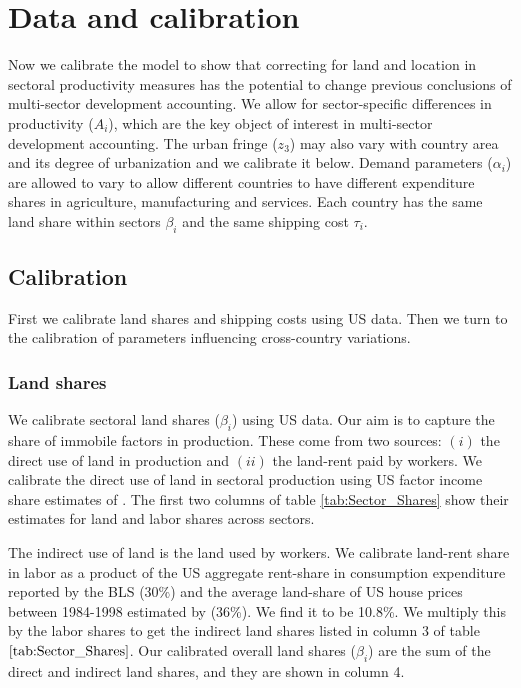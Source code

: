 \documentclass[12pt]{article}
\begin{document}
\section{Data and calibration}
Now we calibrate the model to show that correcting for land and location in sectoral productivity measures has the potential to change previous conclusions of multi-sector development accounting.
We allow for sector-specific differences in productivity ($A_i$), which are the key object of interest in multi-sector development accounting. The urban fringe ($z_3$) may also vary with country area and its degree of urbanization and we calibrate it below. Demand parameters ($\alpha_i$) are allowed to vary to allow different countries to have different expenditure shares in agriculture, manufacturing and services. %
Each country has the same land share within sectors $\beta_i$ and the same shipping cost $\tau_i$.

\subsection{Calibration}
First we calibrate land shares and shipping costs using US data. Then we turn to the calibration of parameters influencing cross-country variations.

\subsubsection{Land shares}
We calibrate sectoral land shares ($\beta_i$) using US data. Our aim is to capture the share of immobile factors in production. These come from two sources: $(i)$ the direct use of land in production and $(ii)$ the land-rent paid by workers. We calibrate the direct use of land in sectoral production using US factor income share estimates of . The first two columns of table \ref{tab:Sector_Shares} show their estimates for land and labor shares across sectors.

The indirect use of land is the land used by workers. We calibrate land-rent share in labor as a product of the US aggregate rent-share in consumption expenditure reported by the BLS ($30\%$) and the average land-share of US house prices between 1984-1998 estimated by  (36\%). We find it to be 10.8\%. We multiply this by the labor shares to get the indirect land shares listed in column 3 of table $\ref{tab:Sector_Shares}$. Our calibrated overall land shares ($\beta_i$) are the sum of the direct and indirect land shares, and they are shown in column 4.
\end{document}
